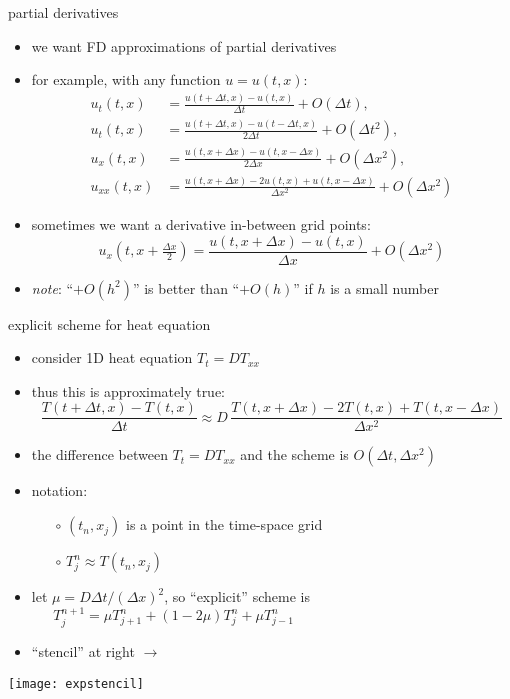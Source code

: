\begin{frame}{partial derivatives}

\begin{itemize}
\item we want FD approximations of partial derivatives
\item for example, with any function $u=u(t,x)$:
\small
\begin{align*}
u_t(t,x) &= \frac{u(t+\Delta t,x) - u(t,x)}{\Delta t} + O(\Delta t), \\
u_t(t,x) &= \frac{u(t+\Delta t,x) - u(t-\Delta t,x)}{2\Delta t} + O(\Delta t^2), \\
u_x(t,x) &= \frac{u(t,x+\Delta x) - u(t,x-\Delta x)}{2\Delta x} + O(\Delta x^2), \\
u_{xx}(t,x) &= \frac{u(t,x+\Delta x) - 2 u(t,x) + u(t,x-\Delta x)}{\Delta x^2} + O(\Delta x^2)
\end{align*}
\normalsize
\item sometimes we want a derivative in-between grid points:
\small
	$$u_x(t,x+\tfrac{\Delta x}{2}) = \frac{u(t,x+\Delta x) - u(t,x)}{\Delta x} + O(\Delta x^2)$$
\normalsize
\item \emph{note}: ``$+O(h^2)$'' is better than ``$+O(h)$'' if $h$ is a small number
\end{itemize}
\end{frame}


\begin{frame}{explicit scheme for heat equation}
\label{slide:explicit}

\begin{itemize}
\item consider 1D heat equation $T_t = D T_{xx}$
\item thus this is approximately true:
\small
	$$\frac{T(t+\Delta t,x) - T(t,x)}{\Delta t} \approx D\,\frac{T(t,x+\Delta x) - 2 T(t,x) + T(t,x-\Delta x)}{\Delta x^2}$$
\normalsize
\item the difference between $T_t = D T_{xx}$ and the scheme is $O(\Delta t,\Delta x^2)$
\item notation:
    \begin{itemize}
    \item[$\circ$] $(t_n,x_j)$ is a point in the time-space grid
    \item[$\circ$] $T_j^n \approx T(t_n,x_j)$  
    \end{itemize} 
\item let $\mu = D \Delta t / (\Delta x)^2$, so ``explicit'' scheme is
\small
	$$T_j^{n+1} = \mu T_{j+1}^n + (1 - 2 \mu) T_j^n + \mu T_{j-1}^n \phantom{sdfkj sdkfj asdlfj asldkfj asdflkj}$$
\normalsize
\item ``stencil'' at right \large $\to$ \normalsize
\end{itemize}

\vspace{-12mm}
\hfill \texttt{[image: expstencil]}
\end{frame}


